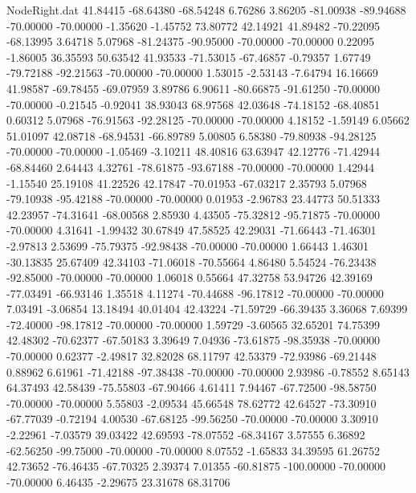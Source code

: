 \begin{filecontents}{NodeRight.dat}
  41.84415  -68.64380  -68.54248     6.76286    3.86205  -81.00938  -89.94688  -70.00000  -70.00000   -1.35620   -1.45752   73.80772   42.14921
  41.89482  -70.22095  -68.13995     3.64718    5.07968  -81.24375  -90.95000  -70.00000  -70.00000    0.22095   -1.86005   36.35593   50.63542
  41.93533  -71.53015  -67.46857    -0.79357    1.67749  -79.72188  -92.21563  -70.00000  -70.00000    1.53015   -2.53143   -7.64794   16.16669
  41.98587  -69.78455  -69.07959     3.89786    6.90611  -80.66875  -91.61250  -70.00000  -70.00000   -0.21545   -0.92041   38.93043   68.97568
  42.03648  -74.18152  -68.40851     0.60312    5.07968  -76.91563  -92.28125  -70.00000  -70.00000    4.18152   -1.59149    6.05662   51.01097
  42.08718  -68.94531  -66.89789     5.00805    6.58380  -79.80938  -94.28125  -70.00000  -70.00000   -1.05469   -3.10211   48.40816   63.63947
  42.12776  -71.42944  -68.84460     2.64443    4.32761  -78.61875  -93.67188  -70.00000  -70.00000    1.42944   -1.15540   25.19108   41.22526
  42.17847  -70.01953  -67.03217     2.35793    5.07968  -79.10938  -95.42188  -70.00000  -70.00000    0.01953   -2.96783   23.44773   50.51333
  42.23957  -74.31641  -68.00568     2.85930    4.43505  -75.32812  -95.71875  -70.00000  -70.00000    4.31641   -1.99432   30.67849   47.58525
  42.29031  -71.66443  -71.46301    -2.97813    2.53699  -75.79375  -92.98438  -70.00000  -70.00000    1.66443    1.46301  -30.13835   25.67409
  42.34103  -71.06018  -70.55664     4.86480    5.54524  -76.23438  -92.85000  -70.00000  -70.00000    1.06018    0.55664   47.32758   53.94726
  42.39169  -77.03491  -66.93146     1.35518    4.11274  -70.44688  -96.17812  -70.00000  -70.00000    7.03491   -3.06854   13.18494   40.01404
  42.43224  -71.59729  -66.39435     3.36068    7.69399  -72.40000  -98.17812  -70.00000  -70.00000    1.59729   -3.60565   32.65201   74.75399
  42.48302  -70.62377  -67.50183     3.39649    7.04936  -73.61875  -98.35938  -70.00000  -70.00000    0.62377   -2.49817   32.82028   68.11797
  42.53379  -72.93986  -69.21448     0.88962    6.61961  -71.42188  -97.38438  -70.00000  -70.00000    2.93986   -0.78552    8.65143   64.37493
  42.58439  -75.55803  -67.90466     4.61411    7.94467  -67.72500  -98.58750  -70.00000  -70.00000    5.55803   -2.09534   45.66548   78.62772
  42.64527  -73.30910  -67.77039    -0.72194    4.00530  -67.68125  -99.56250  -70.00000  -70.00000    3.30910   -2.22961   -7.03579   39.03422
  42.69593  -78.07552  -68.34167     3.57555    6.36892  -62.56250  -99.75000  -70.00000  -70.00000    8.07552   -1.65833   34.39595   61.26752
  42.73652  -76.46435  -67.70325     2.39374    7.01355  -60.81875 -100.00000  -70.00000  -70.00000    6.46435   -2.29675   23.31678   68.31706

\end{filecontents}
